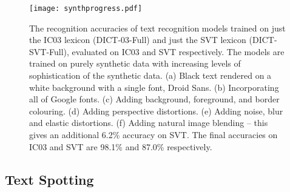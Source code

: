 \documentclass[twocolumn]{svjour3}          \smartqed  \usepackage{epsfig}
\begin{document}
\begin{figure}
\begin{center}
\texttt{[image: synthprogress.pdf]} 
\caption{The recognition accuracies of text recognition models trained on just the IC03 lexicon (DICT-03-Full) and just the SVT lexicon (DICT-SVT-Full), evaluated on IC03 and SVT respectively. The models are trained on purely synthetic data with increasing levels of sophistication of the synthetic data. (a) Black text rendered on a white background with a single font, Droid Sans. (b) Incorporating all of Google fonts. (c) Adding background, foreground, and border colouring. (d) Adding perspective distortions. (e) Adding noise, blur and elastic distortions. (f) Adding natural image blending -- this gives an additional 6.2\% accuracy on SVT. The final accuracies on IC03 and SVT are 98.1\% and 87.0\% respectively.}
\label{fig:synthprogress}
\end{center}
\end{figure}

\subsection{Text Spotting}
\label{sec:textspotting}
\end{document}
